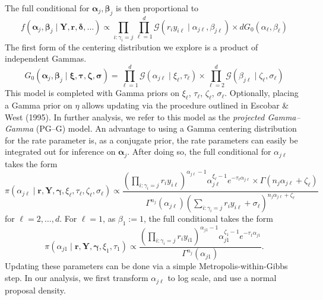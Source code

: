 \documentclass[12pt]{article}
\begin{document}
The full conditional for $\bm{\alpha}_j,\bm{\beta}_j$ is then proportional to
\begin{equation}
    f(\bm{\alpha}_j,\bm{\beta}_j\mid \bm{Y},\bm{r},\bm{\delta},\ldots) \propto \prod_{i:\gamma_i = j}\prod_{\ell = 1}^d\mathcal{G}\left(r_iy_{i\ell}\mid\alpha_{j\ell},\beta_{j\ell}\right) \times dG_0(\alpha_{\ell},\beta_{\ell})
\end{equation}
The first form of the centering distribution we explore is a product of independent Gammas.
\begin{equation}
    G_0(\bm{\alpha}_j,\bm{\beta}_j\mid \bm{\xi},\bm{\tau},\bm{\zeta},\bm{\sigma}) = \prod_{\ell = 1}^d\mathcal{G}(\alpha_{j\ell}\mid \xi_{\ell},\tau_{\ell})\times\prod_{\ell = 2}^d\mathcal{G}(\beta_{j\ell}\mid\zeta_{\ell},\sigma_{\ell})
\end{equation}
This model is completed with Gamma priors on $\xi_{\ell}$, $\tau_{\ell}$, $\zeta_{\ell}$, $\sigma_{\ell}$.  Optionally, placing a Gamma prior on $\eta$ allows updating via the procedure outlined in Escobar \& West (1995).  In further analysis, we refer to this model as the \emph{projected Gamma--Gamma} (PG--G) model.  An advantage to using a Gamma centering distribution for the rate parameter is, as a conjugate prior, the rate parameters can easily be integrated out for inference on $\bm{\alpha}_j$.  After doing so, the full conditional for $\alpha_{j\ell}$ takes the form
\begin{equation}
    \pi(\alpha_{j\ell}\mid \bm{r},\bm{Y},\bm{\gamma},\xi_\ell,\tau_\ell,\zeta_\ell,\sigma_\ell) \propto \frac{\left(\prod_{i:\gamma_i = j}r_iy_{i\ell}\right)^{\alpha_{j\ell} - 1}\alpha_{j\ell}^{\xi_\ell - 1}e^{-\tau_\ell \alpha_{j\ell}}\times\Gamma\left(n_j\alpha_{j\ell} + \zeta_{\ell}\right)}{\Gamma^{n_j}(\alpha_{j\ell})\left(\sum_{i:\gamma_i = j}r_iy_{i\ell} + \sigma_{\ell}\right)^{n_j\alpha_{j\ell} + \zeta_{\ell}}}
\end{equation}
for $\ell = 2,\ldots,d$.  For $\ell = 1$, as $\beta_{1} := 1$, the full conditional takes the form
\begin{equation}
    \label{eqn:alpha1update}
    \pi(\alpha_{j1}\mid\bm{r},\bm{Y},\bm{\gamma},\xi_1,\tau_1) \propto \frac{\left(\prod_{i:\gamma_i = j}r_iy_{i1}\right)^{\alpha_{j1} - 1}\alpha_{j1}^{\zeta_1 - 1}e^{-\tau_1\alpha_{j1}}}{\Gamma^{n_j}(\alpha_{j1})}.
\end{equation}
Updating these parameters can be done via a simple Metropolis-within-Gibbs step.  In our analysis, we first transform $\alpha_{j\ell}$ to log scale, and use a normal proposal density.
\end{document}
